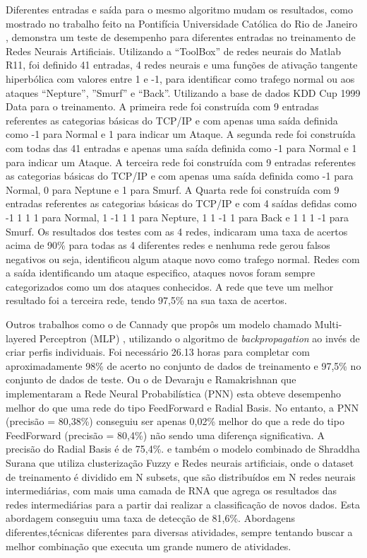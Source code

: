 Diferentes entradas e saída para o mesmo algoritmo mudam os resultados, como mostrado no trabalho feito na Pontifícia Universidade Católica do Rio de Janeiro \cite{RenatoMaia}, demonstra um teste de desempenho para diferentes entradas no treinamento de Redes Neurais Artificiais. Utilizando a “ToolBox” de redes neurais do Matlab R11, foi definido 41 entradas, 4 redes neurais e uma funções de ativação tangente hiperbólica com valores entre 1 e -1, para identificar como trafego normal ou aos ataques “Nepture”, ”Smurf” e “Back”. Utilizando a base de dados KDD Cup 1999 Data\cite{KDDCup99} para o treinamento. 
A primeira rede foi construída com 9 entradas referentes as categorias básicas do TCP/IP e com apenas uma saída definida como -1 para Normal e 1 para indicar um Ataque.
A segunda rede foi construída com todas das 41 entradas e apenas uma saída definida como -1 para Normal e 1 para indicar um Ataque.
A terceira rede foi construída com 9 entradas referentes as categorias básicas do TCP/IP e com apenas uma saída definida como -1 para Normal, 0 para Neptune e 1 para Smurf.
A Quarta rede foi construída com 9 entradas referentes as categorias básicas do TCP/IP e com 4 saídas defidas como -1 1 1 1 para Normal, 1 -1 1 1 para Nepture, 1 1 -1 1 para Back e 1 1 1 -1 para Smurf.
Os resultados dos testes com as 4 redes, indicaram uma taxa de acertos acima de 90\% para todas as 4 diferentes redes e nenhuma rede gerou falsos negativos ou seja, identificou algum ataque novo como trafego normal. Redes com a saída identificando um ataque especifico, ataques novos foram sempre categorizados como um dos ataques conhecidos. A rede que teve um melhor resultado foi a terceira rede, tendo 97,5\% na sua taxa de acertos.

Outros trabalhos como o de Cannady que propôs um modelo chamado Multi-layered Perceptron (MLP) \cite{Cannady}, utilizando o algoritmo de \textit{backpropagation} ao invés de criar perfis individuais. Foi necessário 26.13 horas para completar com aproximadamente 98\% de acerto no conjunto de dados de treinamento e 97,5\% no conjunto de dados de teste. Ou o de Devaraju e Ramakrishnan que implementaram a Rede Neural Probabilística (PNN) \cite{Devaraju} esta obteve desempenho melhor do que uma rede do tipo FeedForward e Radial Basis. No entanto, a PNN (precisão = 80,38\%) conseguiu ser apenas 0,02\% melhor do que a rede do tipo FeedForward (precisão = 80,4\%) não sendo uma diferença significativa. A precisão do  Radial Basis é de 75,4\%.
e também o modelo combinado de Shraddha Surana \cite{Surana} que utiliza clusterização Fuzzy e Redes neurais artificiais, onde o dataset de treinamento é dividido em N subsets, que são distribuídos em N redes neurais intermediárias, com mais uma camada de RNA que agrega os resultados das redes intermediárias para a partir dai realizar a classificação de novos dados. Esta abordagem conseguiu uma taxa de detecção de 81,6\%.
Abordagens diferentes,técnicas diferentes para diversas atividades, sempre tentando buscar a melhor combinação que executa um grande numero de atividades.

